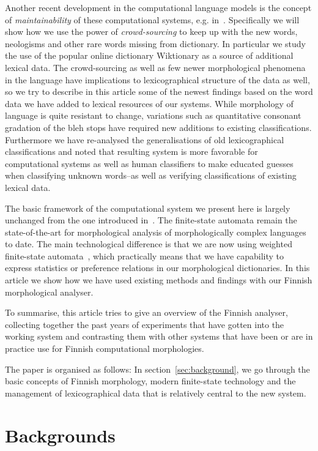 \documentclass[a4paper,12pt]{article}
\begin{document}
Another recent development in the computational language models is the concept
of \emph{maintainability} of these computational systems, e.g.
in~\cite{maxwell}. Specifically we will show how we use the power of
\emph{crowd-sourcing} to keep up with the new words, neologisms and other rare
words missing from dictionary. In particular we study the use of the popular
online dictionary Wiktionary as a source of additional lexical data. The
crowd-sourcing as well as few newer morphological phenomena in the language
have implications to lexicographical structure of the data as well, so we try
to describe in this article some of the newest findings based on the word data
we have added to lexical resources of our systems. While morphology of language
is quite resistant to change, variations such as quantitative consonant
gradation of the bleh stops have required new additions to existing
classifications. Furthermore we have re-analysed the generalisations of old
lexicographical classifications and noted that resulting system is more
favorable for computational systems as well as human classifiers to make
educated guesses when classifying unknown words–as well as verifying
classifications of existing lexical data.

The basic framework of the computational system we present here is largely
unchanged from the one introduced in~\cite{koskenniemi1983twolevel}. 
The finite-state automata remain the state-of-the-art for morphological analysis
of morphologically complex languages to date. The main
technological difference is that we are now using weighted finite-state 
automata~\cite{openfst}, which practically means that we have capability to
express statistics or preference relations in our morphological dictionaries.
In this article we show how we have used existing methods and findings with
our Finnish morphological analyser.

To summarise, this article tries to give an overview of the Finnish analyser,
collecting together the past years of experiments that have gotten into the
working system and contrasting them with other systems that have been or are
in practice use for Finnish computational morphologies.

The paper is organised as follows: In section~\ref{sec:background}, we go
through the basic concepts of Finnish morphology, modern finite-state
technology and the management of lexicographical data that is relatively
central to the new system. 

\section{Backgrounds}
\end{document}
